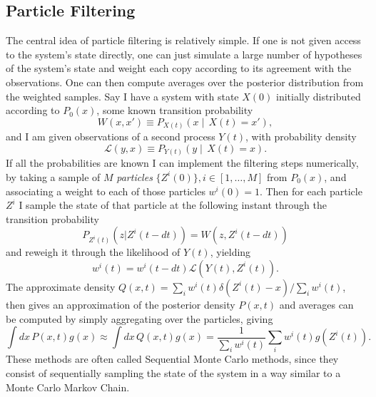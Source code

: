 {\subsection{Particle Filtering}

The central idea of particle filtering is relatively simple. If one is not given access to the system's state directly, one can just simulate a large number of hypotheses of 
the  system's state and weight each copy according to its agreement with the observations. One can then compute averages over the posterior distribution from the 
weighted samples. Say I have a system with state $X(0)$ initially distributed according to $P_0(x)$, some known transition probability 
\[
W(x,x') \equiv P_{X(t)}\left(x\middle|\,X(t)=x'\right),
\]
and I am given observations of a second process $Y(t)$, with probability density 
\[
\mathcal{L}(y,x) \equiv P_{Y(t)}\left(y\middle|\,X(t)=x\right).
\]
If all the probabilities are known I can implement the filtering  steps numerically,
by taking a sample of $M$ \emph{particles} $\{Z^i(0)\}, i \in [1,\ldots,M]$ from $P_0(x)$, and associating a weight to each of those 
particles $w^i(0)= 1$. Then for each 
particle $Z^i$ I sample the state of that particle at the following instant through the transition probability 
\[
P_{Z^i(t)}(z|Z^i(t-dt)) = W(z,Z^i(t-dt))
\]
and reweigh it through the likelihood
of $Y(t)$, yielding 
\[
w^i(t) = w^i(t-dt) \mathcal{L}(Y(t),Z^i(t)).
\]
The approximate density $Q(x,t) = \sum_i w^i(t)\delta(Z^i(t) - x)/\sum_i w^i(t)$, then gives an 
approximation of the
posterior density $P(x,t)$ and averages can be computed by simply aggregating over the particles, giving
\[
\int dx\, P(x,t) g(x)  \approx \int dx\, Q(x,t) g(x)  = \frac{1}{\sum_i w^i(t) }\sum_i w^i(t) g(Z^i(t)).
\]
These methods are often called Sequential Monte Carlo methods, since they consist of sequentially sampling the 
state of the system in a way similar to a Monte Carlo Markov Chain.
\par

}
